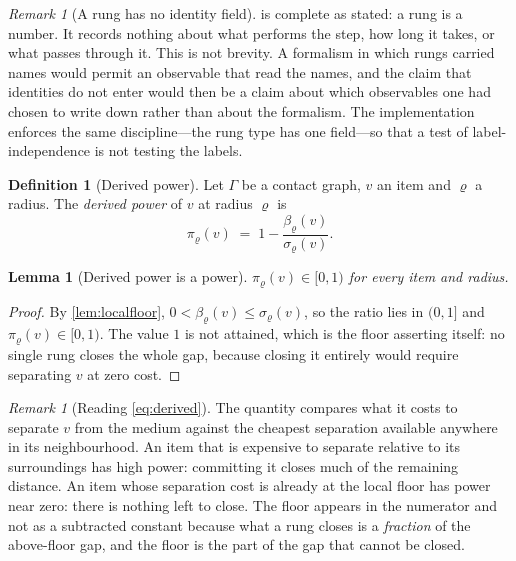 \documentclass[11pt,twocolumn,a4paper]{article}
\theoremstyle{plain}
\newtheorem{lemma}[theorem]{Lemma}
\theoremstyle{definition}
\newtheorem{definition}[theorem]{Definition}
\theoremstyle{remark}
\newtheorem{remark}[theorem]{Remark}
\newcommand{\Gph}{\Gamma}
\newcommand{\flo}{\beta}
\newcommand{\sepc}{\sigma}
\newcommand{\pow}{\pi}
\newcommand{\rad}{\varrho}
\begin{document}
\begin{remark}[A rung has no identity field]
\label{rem:noidentity}
 is complete as stated: a rung is a number. It records nothing
about what performs the step, how long it takes, or what passes through it.
This is not brevity. A formalism in which rungs carried names would permit an
observable that read the names, and the claim that identities do not enter
would then be a claim about which observables one had chosen to write down
rather than about the formalism. The implementation enforces the same
discipline---the rung type has one field---so that a test of
label-independence is not testing the labels.
\end{remark}

\begin{definition}[Derived power]
\label{def:derived}
Let $\Gph$ be a contact graph, $v$ an item and $\rad$ a radius. The
\emph{derived power} of $v$ at radius $\rad$ is
\begin{equation}
\pow_\rad(v)\;=\;1-\frac{\flo_\rad(v)}{\sepc_\rad(v)}.
\label{eq:derived}
\end{equation}
\end{definition}

\begin{lemma}[Derived power is a power]
\label{lem:derived-bounded}
$\pow_\rad(v)\in[0,1)$ for every item and radius.
\end{lemma}

\begin{proof}
By \cref{lem:localfloor}, $0<\flo_\rad(v)\le\sepc_\rad(v)$, so the ratio lies
in $(0,1]$ and $\pow_\rad(v)\in[0,1)$. The value $1$ is not attained, which is
the floor asserting itself: no single rung closes the whole gap, because
closing it entirely would require separating $v$ at zero cost.
\end{proof}

\begin{remark}[Reading \cref{eq:derived}]
\label{rem:reading-derived}
The quantity compares what it costs to separate $v$ from the medium against the
cheapest separation available anywhere in its neighbourhood. An item that is
expensive to separate relative to its surroundings has high power: committing
it closes much of the remaining distance. An item whose separation cost is
already at the local floor has power near zero: there is nothing left to close.
The floor appears in the numerator and not as a subtracted constant because
what a rung closes is a \emph{fraction} of the above-floor gap, and the floor
is the part of the gap that cannot be closed.
\end{remark}
\end{document}

